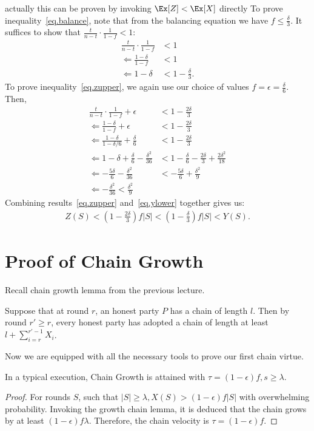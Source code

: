 {\color{red} actually this can be proven by invoking $\Ex[Z] < \Ex[X]$ directly}
To prove inequality~\ref{eq.balance}, note that from the balancing equation we have $f \leq \frac{\delta}{3}$. It suffices to show that $\frac{t}{n-t}\cdot\frac{1}{1-f} < 1$:
\begin{align}
\frac{t}{n-t}\cdot\frac{1}{1-f} &< 1\\
\Leftarrow \frac{1-\delta}{1-f} &< 1\\
\Leftarrow 1-\delta &< 1 -\frac{\delta}{3}.
\end{align}
To prove inequality~\ref{eq.zupper}, we again use our choice of values $f = \epsilon = \frac{\delta}{6}$. Then,
\begin{align}
    \frac{t}{n-t}\cdot\frac{1}{1-f} + \epsilon &< 1 - \frac{2\delta}{3}\\
    \Leftarrow \frac{1-\delta}{1-f} + \epsilon &< 1-\frac{2\delta}{3}\\
    \Leftarrow \frac{1-\delta}{1-\delta/6} + \frac{\delta}{6} &< 1 - \frac{2\delta}{3}\\
    \Leftarrow 1-\delta + \frac{\delta}{6} -\frac{\delta^2}{36} &< 1- \frac{\delta}{6} -\frac{2\delta}{3} + \frac{2\delta^2}{18}\\
    \Leftarrow -\frac{5\delta}{6}-\frac{\delta^2}{36} &< -\frac{5\delta}{6} + \frac{\delta^2}{9}\\
    \Leftarrow -\frac{\delta^2}{36} < \frac{\delta^2}{9}
\end{align}
Combining results~\ref{eq.zupper} and~\ref{eq.ylower} together gives us:
\begin{align}
Z(S) < \left(1 - \frac{2\delta}{3}\right)f|S| <  \left(1 - \frac{\delta}{3}\right)f|S| <
Y(S).
\end{align}

\section{Proof of Chain Growth}
Recall chain growth lemma from the previous lecture.
\begin {lemma}
    Suppose that at round $r$, an honest party $P$ has a chain of length $l$. Then by round $r' \geq r$, every honest party has adopted a chain of length at least $l + \sum_{i=r}^{r'-1} X_i$.
\end {lemma}
Now we are equipped with all the necessary tools to prove our first chain virtue.

\begin{theorem}\label{thm.chain-growth}
In a typical execution, Chain Growth is attained with $\tau = (1-\epsilon)f, s \geq \lambda$.
\end{theorem}
\begin{proof}
For rounds $S$, such that $|S| \geq \lambda, X(S) > (1-\epsilon)f|S|$ with overwhelming probability. Invoking the growth chain lemma, it is deduced that the chain grows by at least $(1-\epsilon)f\lambda$. Therefore, the chain velocity is $\tau = (1-\epsilon)f$.
\end{proof}


